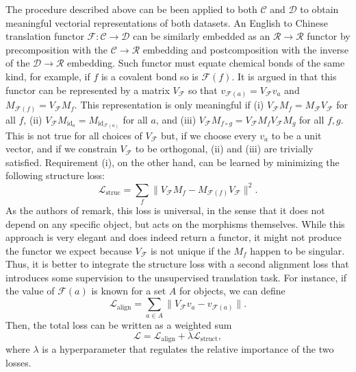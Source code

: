\documentclass[11pt,a4paper,openright,twoside]{report}
\theoremstyle{plain}
\theoremstyle{definition}
\begin{document}
The procedure described above can be been applied to both $\mathcal{C}$ and $\mathcal{D}$ to obtain meaningful vectorial representations of both datasets. An English to Chinese translation functor $\mathcal{F}: \mathcal{C} \to \mathcal{D}$ can be similarly embedded as an $\mathcal{R} \to \mathcal{R}$ functor by precomposition with the $\mathcal{C} \to \mathcal{R}$ embedding and postcomposition with the inverse of the $\mathcal{D} \to \mathcal{R}$ embedding. Such functor must equate chemical bonds of the same kind, for example, if $f$ is a covalent bond so is $\mathcal{F}(f)$. It is argued in \cite{sheshmani2021categorical} that this functor can be represented by a matrix $V_\mathcal{F}$ so that $v_{\mathcal{F}(a)} =  V_\mathcal{F}v_a$ and $M_{\mathcal{F}(f)} = V_\mathcal{F}M_f$. This representation is only meaningful if (i) $V_{\mathcal{F}}M_f = M_{\mathcal{F}}V_{\mathcal{F}}$ for all $f$, (ii) $V_{\mathcal{F}}M_{\mathrm{id}_a} = M_{\mathrm{id}_{\mathcal{F}(a)}}$ for all $a$, and (iii) $V_{\mathcal{F}}M_{f \circ g} = V_{\mathcal{F}}M_fV_{\mathcal{F}}M_g$ for all $f,g$. This is not true for all choices of  $V_\mathcal{F}$ but, if we choose every $v_a$ to be a unit vector, and if we constrain $V_{\mathcal{F}}$ to be orthogonal, (ii) and (iii) are trivially satisfied. Requirement (i), on the other hand, can be learned by minimizing the following structure loss:
\[\mathcal{L}_{\mathrm{struc}} = \sum_{f}\|V_{\mathcal{F}}M_f - M_{\mathcal{F}(f)}V_{\mathcal{F}}\|^2.\]
As the authors of \cite{sheshmani2021categorical} remark, this loss is universal, in the sense that it does not depend on any specific object, but acts on the morphisms themselves. While this approach is very elegant and does indeed return a functor, it might not produce the functor we expect because $V_{\mathcal{F}}$ is not unique if the $M_f$ happen to be singular. Thus, it is better to integrate the structure loss with a second alignment loss that introduces some supervision to the unsupervised translation task. For instance, if the value of $\mathcal{F}(a)$ is known for a set $A$ for objects, we can define
\[\mathcal{L}_{\mathrm{align}} = \sum_{a \in A}\|V_{\mathcal{F}}v_a - v_{\mathcal{F}(a)}\|.\]
Then, the total loss can be written as a weighted sum 
\begin{equation}
  \label{eq: sumoflosses2}
  \mathcal{L} = \mathcal{L}_{\mathrm{align}} + \lambda \mathcal{L}_{\mathrm{struct}},
\end{equation}
where $\lambda$ is a hyperparameter that regulates the relative importance of the two losses.
\end{document}
